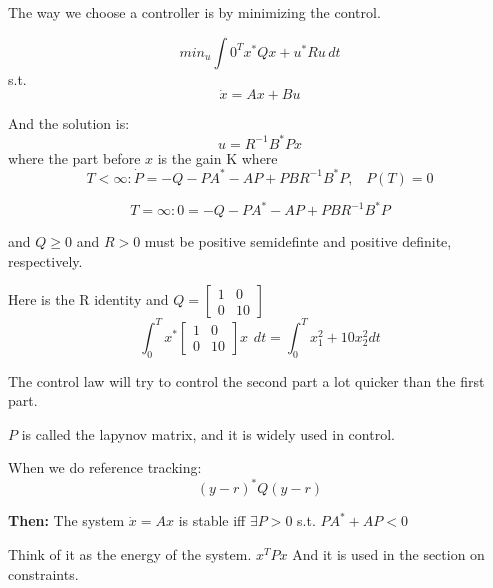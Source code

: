 \documentclass[a4paper]{article}
\begin{document}
The way we choose a controller is by minimizing the control.

\begin{equation}
	min_{u} \int{0}^{T}{x^{*} Q x + u^{*} R u \hspace{2pt} dt}
\end{equation}
s.t. 
\begin{equation}
\dot{x} = Ax + Bu
\end{equation}

And the solution is:
\begin{equation}
 u = R^{-1}B^{*}Px   
\end{equation}
where the part before $ x $ is the gain K
where 
\begin{equation}
	T < \infty : \dot{P} = - Q - P A^{*} - AP + PBR^{-1}B^{*}P, \hspace{10pt} P(T) = 0   
\end{equation}

\begin{equation}
	T = \infty : 0 = - Q - P A^{*} - AP + PBR^{-1}B^{*}P
\end{equation}

and $ Q \geq 0 $ and  $ R >0 $ must be positive semidefinte and positive definite, respectively.

Here is the R identity and $ Q = \begin{bmatrix}
1 & 0 \\
0 & 10
\end{bmatrix} $
\begin{equation}
\int_{0}^{T}{x^{*} \begin{bmatrix}
1 & 0 \\
0 & 10
\end{bmatrix} x \hspace{5pt} dt } = \int_{0}^{T}{x_1^{2} +10 x_2^{2} dt}
\end{equation}


The control law will try to control the second part a lot quicker than the first part.

$ P $ is called the lapynov matrix, and it is widely used in control. 

When we do reference tracking:
\begin{equation}
	(y-r)^{*}Q(y-r) 
\end{equation}

\begin{framed}
\textbf{Then:} The system $ \dot{x} = Ax $ is stable iff $ \exists P > 0 $ s.t.  $ P A ^{*} + A P < 0 $ 	
\end{framed}

Think of it as the energy of the system.
$ x^{T} P x $
And it is used in the section on constraints.
\end{document}
